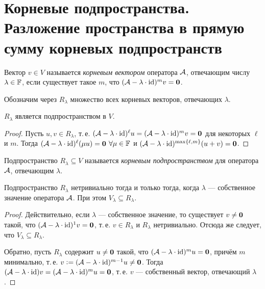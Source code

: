 \section{Корневые подпространства. Разложение пространства в прямую сумму корневых подпространств}

\begin{definition}
    Вектор $v \in V$ называется \textit{корневым вектором} оператора $\mathcal{A}$, отвечающим числу $\lambda \in \mathbb{F}$, если существует такое $m$, что $(\mathcal{A} - \lambda \cdot \mathrm{id})^mv = \boldsymbol{0}$.
\end{definition}

Обозначим через $R_\lambda$ множество всех корневых векторов, отвечающих $\lambda$.

\begin{proposal}
    $R_\lambda$ является подпространством в $V$.
\end{proposal}

\begin{proof}
    Пусть $u, v \in R_\lambda$, т.\,е. $(\mathcal{A} - \lambda \cdot \mathrm{id})^\ell u = (\mathcal{A} - \lambda \cdot \mathrm{id})^mv = \boldsymbol{0}$ для некоторых $\ell$ и $m$. Тогда $(\mathcal{A} - \lambda \cdot \mathrm{id})^\ell(\mu u) = \boldsymbol{0}$ $\forall \mu \in \mathbb{F}$ и $(\mathcal{A} - \lambda \cdot \mathrm{id})^{\max\{\ell, m\}}(u + v) = \boldsymbol{0}$.
\end{proof}

\begin{definition}
    Подпространство $R_\lambda \subseteq V$ называется \textit{корневым подпространством} для оператора $\mathcal{A}$, отвечающим $\lambda$.
\end{definition}

\begin{proposal}
    Подпространство $R_\lambda$ нетривиально тогда и только тогда, когда $\lambda$ --- собственное значение оператора $\mathcal{A}$. При этом $V_\lambda \subseteq R_\lambda$.
\end{proposal}

\begin{proof}
    Действительно, если $\lambda$ --- собственное значение, то существует $v \ne \boldsymbol{0}$ такой, что $(\mathcal{A} - \lambda \cdot \mathrm{id})^1v = \boldsymbol{0}$, т.\,е. $v \in R_\lambda$ и $R_\lambda$ нетривиально. Отсюда же следует, что $V_\lambda \subseteq R_\lambda$.

    Обратно, пусть $R_\lambda$ содержит $u \ne \boldsymbol{0}$ такой, что $(\mathcal{A} - \lambda \cdot \mathrm{id})^mu = \boldsymbol{0}$, причём $m$ минимально, т.\,е. $v \vcentcolon = (\mathcal{A} - \lambda \cdot \mathrm{id})^{m - 1}u \ne \boldsymbol{0}$. Тогда $(\mathcal{A} - \lambda \cdot \mathrm{id})v = (\mathcal{A} - \lambda \cdot \mathrm{id})^mu = \boldsymbol{0}$, т.\,е. $v$ --- собственный вектор, отвечающий $\lambda$.
\end{proof}

